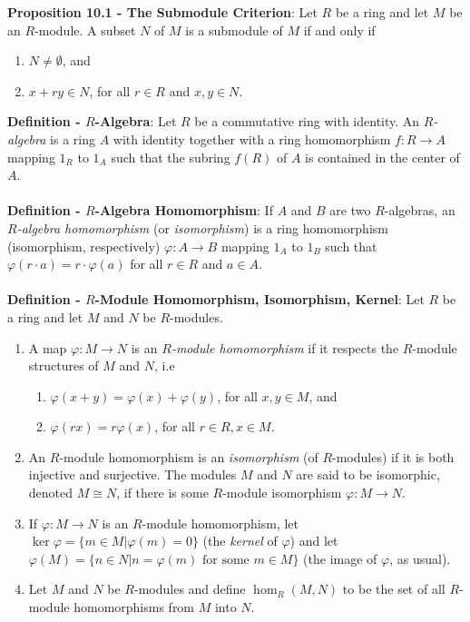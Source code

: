 \documentclass{article}
\begin{document}
\textbf{Proposition 10.1 - The Submodule Criterion}: Let $R$ be a ring and let $M$ be an $R$-module. A subset $N$ of $M$ is a submodule of $M$ if and only if \begin{enumerate}
    \item $N \neq \emptyset$, and
    \item $x + ry \in N$, for all $r \in R$ and $x, y \in N$.
\end{enumerate} $ $ \\
\textbf{Definition - $R$-Algebra}: Let $R$ be a commutative ring with identity. An \textit{$R$-algebra} is a ring $A$ with identity together with a ring homomorphism $f: R \rightarrow A$ mapping $1_R$ to $1_A$ such that the subring $f(R)$ of $A$ is contained in the center of $A$. \\ \\
\textbf{Definition - $R$-Algebra Homomorphism}: If $A$ and $B$ are two $R$-algebras, an \textit{$R$-algebra homomorphism} (or \textit{isomorphism}) is a ring homomorphism (isomorphism, respectively) $\varphi: A \rightarrow B$ mapping $1_A$ to $1_B$ such that $\varphi(r \cdot a) = r \cdot \varphi(a)$ for all $r \in R$ and $a \in A$. \\ \\
\textbf{Definition - $R$-Module Homomorphism, Isomorphism, Kernel}: Let $R$ be a ring and let $M$ and $N$ be $R$-modules. \begin{enumerate}
    \item A map $\varphi: M \rightarrow N$ is an \textit{$R$-module homomorphism} if it respects the $R$-module structures of $M$ and $N$, i.e \begin{enumerate}
        \item $\varphi(x + y) = \varphi(x) + \varphi(y)$, for all $x, y \in M$, and
        \item $\varphi(rx) = r\varphi(x)$, for all $r \in R, x \in M$.
    \end{enumerate}
    \item An $R$-module homomorphism is an \textit{isomorphism} (of $R$-modules) if it is both injective and surjective. The modules $M$ and $N$ are said to be isomorphic, denoted $M \cong N$, if there is some $R$-module isomorphism $\varphi: M \rightarrow N$.
    \item If $\varphi: M \rightarrow N$ is an $R$-module homomorphism, let $\ker \varphi = \{ m \in M | \varphi(m) = 0\}$ (the \textit{kernel} of $\varphi$) and let $\varphi(M) = \{n \in N | n = \varphi(m) \text{ for some } m \in M\}$ (the image of $\varphi$, as usual).
    \item Let $M$ and $N$ be $R$-modules and define $\hom_R(M, N)$ to be the set of all $R$-module homomorphisms from $M$ into $N$.
\end{enumerate} $ $ \\
\end{document}
